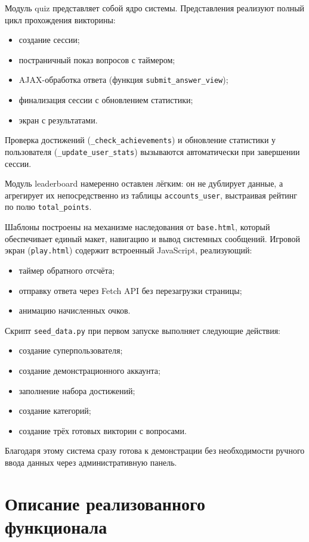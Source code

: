\documentclass[14pt,a4paper]{extreport}
\begin{document}
Модуль quiz представляет собой ядро системы. Представления реализуют полный цикл прохождения викторины:
\begin{itemize}
    \item создание сессии;
    \item постраничный показ вопросов с таймером;
    \item AJAX-обработка ответа (функция \texttt{submit\_answer\_view});
    \item финализация сессии с обновлением статистики;
    \item экран с результатами.
\end{itemize}

Проверка достижений (\texttt{\_check\_achievements}) и обновление статистики у пользователя (\texttt{\_update\_user\_stats}) вызываются автоматически при завершении сессии.

Модуль leaderboard намеренно оставлен лёгким: он не дублирует данные, а агрегирует их непосредственно из таблицы \texttt{accounts\_user}, выстраивая рейтинг по полю \texttt{total\_points}.

Шаблоны построены на механизме наследования от \texttt{base.html}, который обеспечивает единый макет, навигацию и вывод системных сообщений. Игровой экран (\texttt{play.html}) содержит встроенный JavaScript, реализующий:
\begin{itemize}
    \item таймер обратного отсчёта;
    \item отправку ответа через Fetch API без перезагрузки страницы;
    \item анимацию начисленных очков.
\end{itemize}

Скрипт \texttt{seed\_data.py} при первом запуске выполняет следующие действия:
\begin{itemize}
    \item создание суперпользователя;
    \item создание демонстрационного аккаунта;
    \item заполнение набора достижений;
    \item создание категорий;
    \item создание трёх готовых викторин с вопросами.
\end{itemize}

Благодаря этому система сразу готова к демонстрации без необходимости ручного ввода данных через административную панель.

\section{Описание реализованного функционала}
\end{document}
